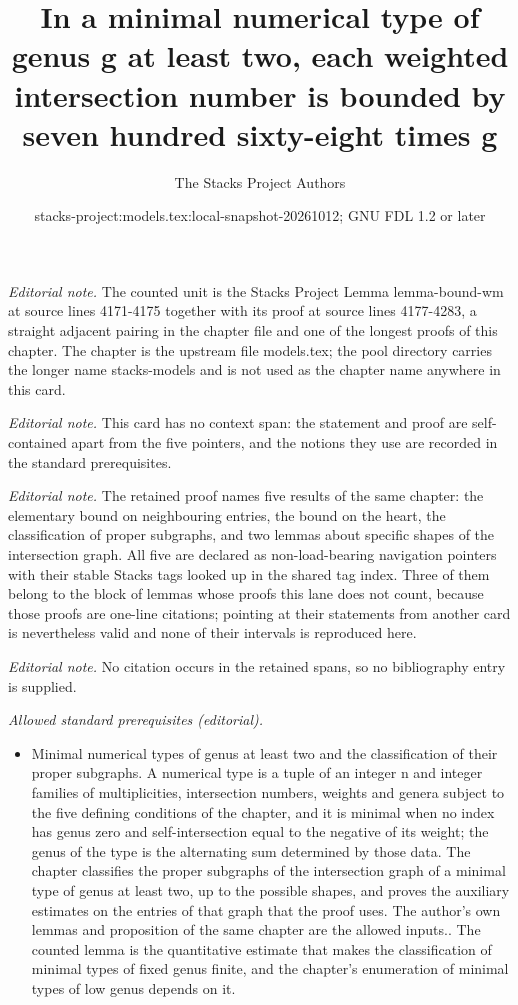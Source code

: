 \documentclass[10pt,a4paper]{amsart}
\title{In a minimal numerical type of genus g at least two, each weighted intersection number is bounded by seven hundred sixty-eight times g}
\author{The Stacks Project Authors}
\date{stacks-project:models.tex:local-snapshot-20261012; GNU FDL 1.2 or later}
\theoremstyle{plain}
\theoremstyle{definition}
\theoremstyle{remark}
\numberwithin{equation}{subsection}
\begin{document}
\maketitle
\noindent\textit{Editorial note.} The counted unit is the Stacks Project Lemma lemma-bound-wm at source lines 4171-4175 together with its proof at source lines 4177-4283, a straight adjacent pairing in the chapter file and one of the longest proofs of this chapter. The chapter is the upstream file models.tex; the pool directory carries the longer name stacks-models and is not used as the chapter name anywhere in this card.\par\medskip
\noindent\textit{Editorial note.} This card has no context span: the statement and proof are self-contained apart from the five pointers, and the notions they use are recorded in the standard prerequisites.\par\medskip
\noindent\textit{Editorial note.} The retained proof names five results of the same chapter: the elementary bound on neighbouring entries, the bound on the heart, the classification of proper subgraphs, and two lemmas about specific shapes of the intersection graph. All five are declared as non-load-bearing navigation pointers with their stable Stacks tags looked up in the shared tag index. Three of them belong to the block of lemmas whose proofs this lane does not count, because those proofs are one-line citations; pointing at their statements from another card is nevertheless valid and none of their intervals is reproduced here.\par\medskip
\noindent\textit{Editorial note.} No citation occurs in the retained spans, so no bibliography entry is supplied.\par\medskip
\noindent\textit{Allowed standard prerequisites (editorial).}\begin{itemize}
\item Minimal numerical types of genus at least two and the classification of their proper subgraphs. A numerical type is a tuple of an integer n and integer families of multiplicities, intersection numbers, weights and genera subject to the five defining conditions of the chapter, and it is minimal when no index has genus zero and self-intersection equal to the negative of its weight; the genus of the type is the alternating sum determined by those data. The chapter classifies the proper subgraphs of the intersection graph of a minimal type of genus at least two, up to the possible shapes, and proves the auxiliary estimates on the entries of that graph that the proof uses. The author's own lemmas and proposition of the same chapter are the allowed inputs.. The counted lemma is the quantitative estimate that makes the classification of minimal types of fixed genus finite, and the chapter's enumeration of minimal types of low genus depends on it.
\end{itemize}\medskip
\end{document}
